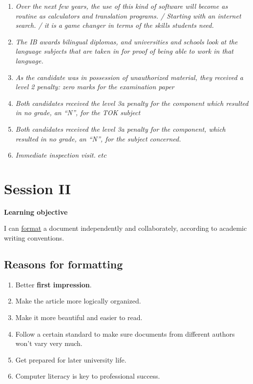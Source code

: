 \documentclass[a4paper]{article}
\begin{document}
\begin{enumerate}
    \item \textit{Over the next few years, the use of this kind of software will become as routine as calculators and translation programs. / Starting with an internet search. / it is a game changer in terms of the skills students need.}
    \item \textit{ The IB awards bilingual diplomas, and universities and schools look at the language subjects that are taken in for proof of being able to work in that language.}
    \item \textit{  As the candidate was in possession of unauthorized material, they received a level 2 penalty: zero marks for the examination paper}
    \item \textit{ Both candidates received the level 3a penalty for the component which resulted in no grade, an “N”, for the TOK subject}
    \item \textit{ Both candidates received the level 3a penalty for the component, which resulted in no grade, an “N”, for the subject concerned.}
    \item \textit{ Immediate inspection visit. $etc$}
\end{enumerate}

\section{Session II}


\textbf{Learning objective}


I can \underline{format} a document independently and collaborately, according to academic writing conventions.

\subsection{Reasons for formatting}

\begin{enumerate}
    \item Better \textbf{first impression}.
    \item Make the article more logically organized.
    \item Make it more beautiful and easier to read.
    \item Follow a certain standard to make sure documents from different authors won't vary very much.
    \item Get prepared for later university life.
    \item Computer literacy is key to professional success.
\end{enumerate}
\end{document}
